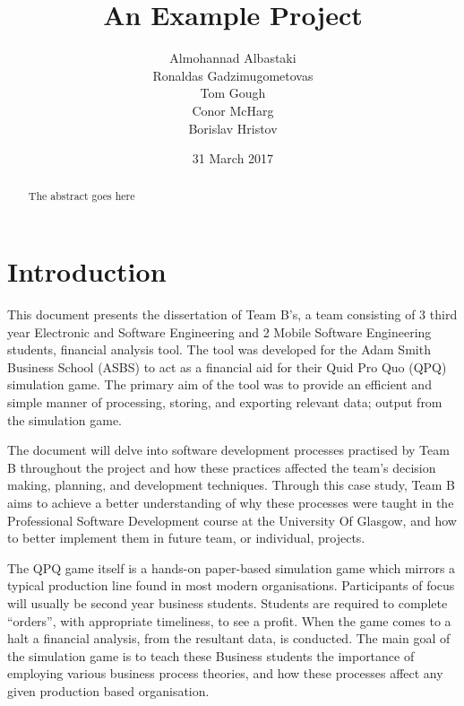 \documentclass{l3proj}
\begin{document}
\title{An Example Project}

\author{Almohannad Albastaki \\
        Ronaldas Gadzimugometovas \\
        Tom Gough \\
     	Conor McHarg \\
        Borislav Hristov}

\date{31 March 2017}

\maketitle

\begin{abstract}

The abstract goes here

\end{abstract}

\educationalconsent

\newpage

\section{Introduction}
\label{sec:introduction}

This document presents the dissertation of Team B’s, a team consisting of 3 third year Electronic and Software Engineering and 2 Mobile Software Engineering students, financial analysis tool. The tool was developed for the Adam Smith Business School (ASBS) to act as a financial aid for their Quid Pro Quo (QPQ) simulation game. The primary aim of the tool was to provide an efficient and simple manner of processing, storing, and exporting relevant data; output from the simulation game.

    The document will delve into software development processes practised by Team B throughout the project and how these practices affected the team’s decision making, planning, and development techniques. Through this case study, Team B aims to achieve a better understanding of why these processes were taught in the Professional Software Development course at the University Of Glasgow, and how to better implement them in future team, or individual, projects.

    The QPQ game itself is a hands-on paper-based simulation game which mirrors a typical production line found in most modern organisations. Participants of focus will usually be second year business students. Students are required to complete “orders”, with appropriate timeliness, to see a profit. When the game comes to a halt a financial analysis, from the resultant data, is conducted. The main goal of the simulation game is to teach these Business students the importance of employing various business process theories, and how these processes affect any given production based organisation. 
\end{document}
